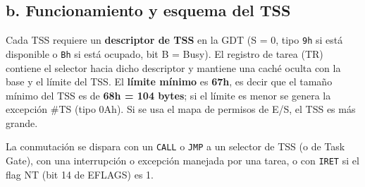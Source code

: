 \documentclass[RT]{UTNLSE}
\begin{document}
\subsection*{b. Funcionamiento y esquema del TSS}
Cada TSS requiere un \textbf{descriptor de TSS} en la GDT (S = 0, tipo \texttt{9h} si está disponible o \texttt{Bh} si está ocupado, bit B = Busy). El registro de tarea (TR) contiene el selector hacia dicho descriptor y mantiene una caché oculta con la base y el límite del TSS. El \textbf{límite mínimo} es \textbf{67h}, es decir que el tamaño mínimo del TSS es de \textbf{68h = 104 bytes}; si el límite es menor se genera la excepción \#TS (tipo 0Ah). Si se usa el mapa de permisos de E/S, el TSS es más grande.

La conmutación se dispara con un \texttt{CALL} o \texttt{JMP} a un selector de TSS (o de Task Gate), con una interrupción o excepción manejada por una tarea, o con \texttt{IRET} si el flag NT (bit 14 de EFLAGS) es 1.

\newcommand{\tssy}[1]{\pgfmathsetmacro{\yt}{-#1*0.35}\pgfmathsetmacro{\yb}{-(#1+1)*0.35}\pgfmathsetmacro{\ym}{(\yt+\yb)/2}}
\newcommand{\tssfull}[3]{\tssy{\thetssrow}%
  \draw[fill=#3] (0,\yt) rectangle (8,\yb);\node at (4,\ym) {#2};%
  \node[anchor=east, font=\scriptsize] at (-0.15,\ym) {#1};\stepcounter{tssrow}}
\newcommand{\tsslow}[3]{\tssy{\thetssrow}%
  \draw[fill=gray!25] (0,\yt) rectangle (4,\yb);\node[font=\scriptsize,text=gray!60!black] at (2,\ym) {Reservado};%
  \draw[fill=#3] (4,\yt) rectangle (8,\yb);\node at (6,\ym) {#2};%
  \node[anchor=east, font=\scriptsize] at (-0.15,\ym) {#1};\stepcounter{tssrow}}
\end{document}
